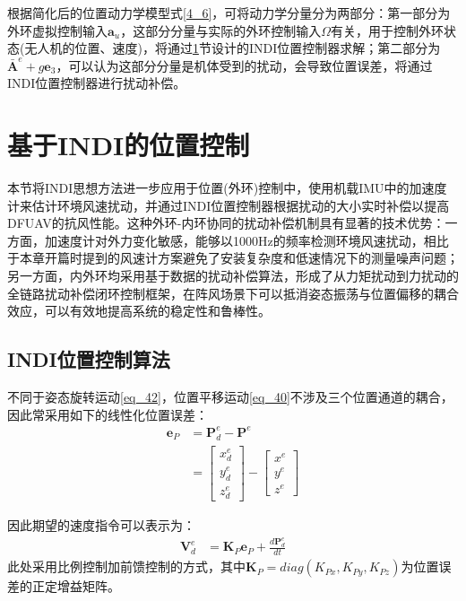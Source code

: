 根据简化后的位置动力学模型式\eqref{4_6}，可将动力学分量分为两部分：第一部分为外环虚拟控制输入$\boldsymbol{a}_u$，这部分分量与实际的外环控制输入$\Omega$有关，用于控制外环状态(无人机的位置、速度)，将通过\ref{基于INDI的位置控制}节设计的INDI位置控制器求解；第二部分为${\boldsymbol{\bar A}}^e+g\boldsymbol{e}_3$，可以认为这部分分量是机体受到的扰动，会导致位置误差，将通过INDI位置控制器进行扰动补偿。

\section{基于INDI的位置控制}\label{基于INDI的位置控制}

本节将INDI思想方法进一步应用于位置(外环)控制中，使用机载IMU中的加速度计来估计环境风速扰动，并通过INDI位置控制器根据扰动的大小实时补偿以提高DFUAV的抗风性能。这种外环-内环协同的扰动补偿机制具有显著的技术优势：一方面，加速度计对外力变化敏感，能够以1000Hz的频率检测环境风速扰动，相比于本章开篇时提到的风速计方案避免了安装复杂度和低速情况下的测量噪声问题；另一方面，内外环均采用基于数据的扰动补偿算法，形成了从力矩扰动到力扰动的全链路扰动补偿闭环控制框架，在阵风场景下可以抵消姿态振荡与位置偏移的耦合效应，可以有效地提高系统的稳定性和鲁棒性。

\subsection{INDI位置控制算法}

不同于姿态旋转运动\eqref{eq_42}，位置平移运动\eqref{eq_40}不涉及三个位置通道的耦合，因此常采用如下的线性化位置误差：
\begin{equation}
    \begin{aligned}
        \boldsymbol{e}_P&=\boldsymbol{P}^e_d-\boldsymbol{P}^e\\
        &=\begin{bmatrix}x_d^e \\y_d^e \\z_d^e\end{bmatrix}-\begin{bmatrix}x^e \\y^e \\z^e\end{bmatrix}
    \end{aligned}
    \label{4_7}
\end{equation}

因此期望的速度指令可以表示为：
\begin{equation}
    \begin{aligned}
        \boldsymbol{V}_d^e&=\boldsymbol{K}_P\boldsymbol{e}_P+\frac{d\boldsymbol{P}^e_d}{dt}
    \end{aligned}
    \label{4_8}
\end{equation}
此处采用比例控制加前馈控制的方式，其中$\boldsymbol{K}_P=diag({K}_{Px},{K}_{Py},{K}_{Pz})$为位置误差的正定增益矩阵。

